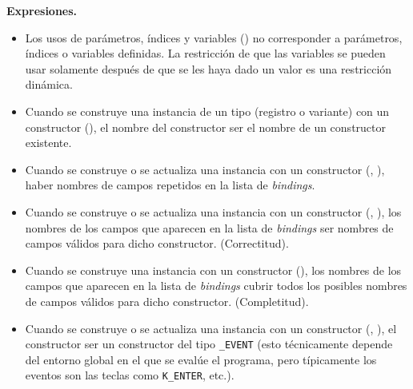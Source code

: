 \documentclass{article}
\begin{document}
{\bf Expresiones.}
\begin{itemize}
\item Los usos de par\'ametros, \'indices y variables () \PUEDEN no corresponder a par\'ametros, \'indices o variables definidas.
      La restricci\'on de que las variables se pueden usar solamente despu\'es de que se les haya dado un valor es una restricci\'on din\'amica.
\item Cuando se construye una instancia de un tipo (registro o variante) con un constructor (),
      el nombre del constructor \DEBE ser el nombre de un constructor existente.
\item Cuando se construye o se actualiza una instancia con un constructor (, ),
      \NOPUEDE haber nombres de campos repetidos en la lista de {\em bindings}.
\item Cuando se construye o se actualiza una instancia con un constructor (, ),
      los nombres de los campos que aparecen en la lista de {\em bindings}
      \DEBEN ser nombres de campos v\'alidos para dicho constructor. (Correctitud).
\item Cuando se construye una instancia con un constructor (),
      los nombres de los campos que aparecen en la lista de {\em bindings}
      \DEBEN cubrir todos los posibles nombres de campos v\'alidos para dicho constructor. (Completitud).
\item Cuando se construye o se actualiza una instancia con un constructor (, ),
      el constructor \NOPUEDE ser un constructor del tipo \texttt{\_EVENT} (esto t\'ecnicamente depende
      del entorno global en el que se eval\'ue el programa, pero t\'ipicamente
      los eventos son las teclas como \texttt{K\_ENTER}, etc.).
\end{itemize}
\end{document}
